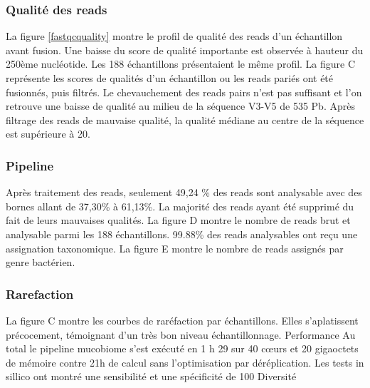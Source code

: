 \documentclass[12pt,a4paper]{article}
\begin{document}
\subsubsection{Qualité des reads}
La figure \ref{fastqcquality} montre le profil de qualité des reads d’un échantillon avant fusion. Une baisse du score de qualité importante est observée à hauteur du 250ème nucléotide. Les 188 échantillons présentaient le même profil.
La figure C représente les scores de qualités d’un échantillon ou les reads pariés ont été fusionnés, puis filtrés. Le chevauchement des reads pairs n’est pas suffisant et l’on retrouve une baisse de qualité au milieu de la séquence V3-V5 de 535 Pb. Après filtrage des reads de mauvaise qualité, la qualité médiane au centre de la séquence est supérieure à 20.
\subsubsection{Pipeline}
Après traitement des reads, seulement 49,24 \% des reads sont analysable avec des bornes allant de 37,30\% à 61,13\%. La majorité des reads ayant été supprimé du fait de leurs mauvaises qualités.
La figure D montre le nombre de reads brut et analysable parmi les 188 échantillons.
99.88\% des reads analysables ont reçu une assignation taxonomique. La figure E montre le nombre de reads assignés par genre bactérien.
\subsubsection{Rarefaction}
La figure C montre les courbes de raréfaction par échantillons.
Elles s’aplatissent précocement, témoignant d’un très bon niveau échantillonnage.
Performance
Au total le pipeline mucobiome s’est exécuté en 1 h 29 sur 40 cœurs et 20 gigaoctets de mémoire contre 21h de calcul sans l’optimisation par déréplication.
Les tests in sillico ont montré une sensibilité et une spécificité de 100%
Diversité
\end{document}
